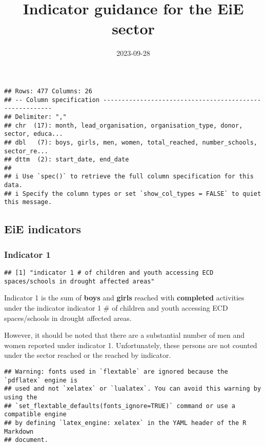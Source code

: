 \documentclass[
]{article}
\title{Indicator guidance for the EiE sector}
\author{}
\date{\vspace{-2.5em}2023-09-28}
\begin{document}
\maketitle

\begin{verbatim}
## Rows: 477 Columns: 26
## -- Column specification --------------------------------------------------------
## Delimiter: ","
## chr  (17): month, lead_organisation, organisation_type, donor, sector, educa...
## dbl   (7): boys, girls, men, women, total_reached, number_schools, sector_re...
## dttm  (2): start_date, end_date
## 
## i Use `spec()` to retrieve the full column specification for this data.
## i Specify the column types or set `show_col_types = FALSE` to quiet this message.
\end{verbatim}

\hypertarget{eie-indicators}{%
\subsection{EiE indicators}\label{eie-indicators}}

\hypertarget{indicator-1}{%
\subsubsection{Indicator 1}\label{indicator-1}}

\begin{verbatim}
## [1] "indicator 1 # of children and youth accessing ECD spaces/schools in drought affected areas"
\end{verbatim}

Indicator 1 is the sum of \textbf{boys} and \textbf{girls} reached with
\textbf{completed} activities under the indicator indicator 1 \# of
children and youth accessing ECD spaces/schools in drought affected
areas.

However, it should be noted that there are a substantial number of men
and women reported under indicator 1. Unfortunately, these persons are
not counted under the sector reached or the reached by indicator.

\begin{verbatim}
## Warning: fonts used in `flextable` are ignored because the `pdflatex` engine is
## used and not `xelatex` or `lualatex`. You can avoid this warning by using the
## `set_flextable_defaults(fonts_ignore=TRUE)` command or use a compatible engine
## by defining `latex_engine: xelatex` in the YAML header of the R Markdown
## document.
\end{verbatim}
\end{document}
